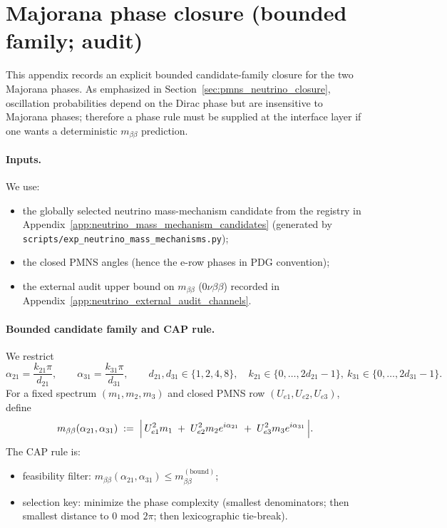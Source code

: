 \section{Majorana phase closure (bounded family; audit)}
\label{app:neutrino_majorana_phase_closure}

This appendix records an explicit bounded candidate-family closure for the two Majorana phases.
As emphasized in Section~\ref{sec:pmns_neutrino_closure}, oscillation probabilities depend on the Dirac phase but are insensitive to Majorana phases; therefore a phase rule must be supplied at the interface layer if one wants a deterministic $m_{\beta\beta}$ prediction.

\paragraph{Inputs.}
\AuditTag We use:
\begin{itemize}
\item the globally selected neutrino mass-mechanism candidate from the registry in Appendix~\ref{app:neutrino_mass_mechanism_candidates} (generated by \texttt{scripts/exp\_neutrino\_mass\_mechanisms.py});
\item the closed PMNS angles (hence the e-row phases in PDG convention);
\item the external audit upper bound on $m_{\beta\beta}$ (0$\nu\beta\beta$) recorded in Appendix~\ref{app:neutrino_external_audit_channels}.
\end{itemize}

\paragraph{Bounded candidate family and CAP rule.}
\AuditTag We restrict
\[
\alpha_{21}=\frac{k_{21}\pi}{d_{21}},\qquad
\alpha_{31}=\frac{k_{31}\pi}{d_{31}},
\qquad d_{21},d_{31}\in\{1,2,4,8\},\quad
k_{21}\in\{0,\dots,2d_{21}-1\},\ k_{31}\in\{0,\dots,2d_{31}-1\}.
\]
For a fixed spectrum $(m_1,m_2,m_3)$ and closed PMNS row $(U_{e1},U_{e2},U_{e3})$, define
\[
m_{\beta\beta}(\alpha_{21},\alpha_{31})
\;:=\;
\Bigl|\,
U_{e1}^2 m_1
\;+\;
U_{e2}^2 m_2 e^{i\alpha_{21}}
\;+\;
U_{e3}^2 m_3 e^{i\alpha_{31}}
\,\Bigr|.
\]
The CAP rule is:
\begin{itemize}
\item feasibility filter: $m_{\beta\beta}(\alpha_{21},\alpha_{31})\le m_{\beta\beta}^{\mathrm{(bound)}}$;
\item selection key: minimize the phase complexity (smallest denominators; then smallest distance to $0$ mod $2\pi$; then lexicographic tie-break).
\end{itemize}

